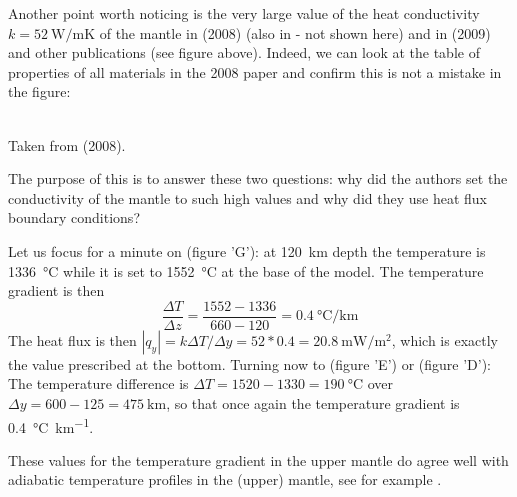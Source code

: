 Another point worth noticing is the very large value of the heat conductivity 
$k=52~\si{\watt\per\meter\kelvin}$
of the mantle in \textcite{wabj08} (2008) (also in \textcite{wabj08b,wabj08c} - not shown here) and 
in \textcite{bejb09} (2009) and other publications (see figure above).
Indeed, we can look at the table of properties of all materials in the 2008 paper and confirm 
this is not a mistake in the figure:

\begin{center}
\\
{\captionfont Taken from \textcite{wabj08} (2008).}
\end{center}

The purpose of this \stone is to answer these two questions: why did the authors set the 
conductivity of the mantle to such high values and why did they use heat flux boundary conditions?

Let us focus for a minute on \textcite{bejb09} (figure 'G'): at \SI{120}{\km} depth the temperature is \SI{1336}{\celsius}
while it is set to \SI{1552}{\celsius} at the base of the model. 
The temperature gradient is then 
\[
\frac{\Delta T}{\Delta z} = \frac{1552-1336}{660-120} = 0.4~\si{\celsius\per\km}
\]
The heat flux is then $|q_y|=k \Delta T/\Delta y = 52*0.4=
20.8~\si{\milli\watt\per\square\meter}$, which is exactly the value prescribed 
at the bottom.
Turning now to \textcite{hube14} (figure 'E') or \textcite{hube11} (figure 'D'): 
The temperature difference is 
$\Delta T=1520-1330=190~\si{\celsius}$ 
over $\Delta y=600-125=475~\si{\km}$, so that once again the 
temperature gradient is 0.4~\si{\celsius\per\km}.

These values for the temperature gradient in the upper mantle do agree well 
with adiabatic temperature profiles in the (upper) mantle, see for example 
\textcite{kayy10}. 


